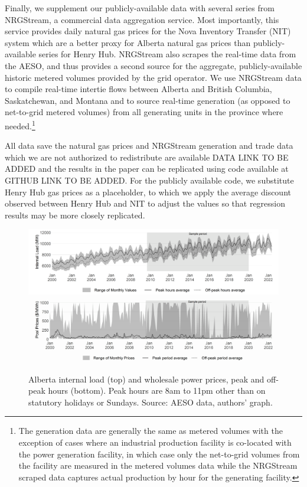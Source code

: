 \documentclass[12pt]{article}
\begin{document}
Finally, we supplement our publicly-available data with several series from NRGStream, a commercial data aggregation service. Most importantly, this service provides daily natural gas prices for the Nova Inventory Transfer (NIT) system which are a better proxy for Alberta natural gas prices than publicly-available series for Henry Hub. NRGStream also scrapes the real-time data from the AESO, and thus provides a second source for the aggregate, publicly-available historic metered volumes provided by the grid operator. We use NRGStream data to compile real-time intertie flows between Alberta and British Columbia, Saskatchewan, and Montana and to source real-time generation (as opposed to net-to-grid metered volumes) from all generating units in the province where needed.\footnote{The generation data are generally the same as metered volumes with the exception of cases where an industrial production facility is co-located with the power generation facility, in which case only the net-to-grid volumes from the facility are measured in the metered volumes data while the NRGStream scraped data captures actual production by hour for the generating facility.}

All data save the natural gas prices and NRGStream generation and trade data which we are not authorized to redistribute are available DATA LINK TO BE ADDED and the results in the paper can be replicated using code available at GITHUB LINK TO BE ADDED. For the publicly available code, we substitute Henry Hub gas prices as a placeholder, to which we apply the average discount observed between Henry Hub and NIT to adjust the values so that regression results may be more closely replicated.
\begin{figure}[h]%
	\centering \vspace{-.25cm} \includegraphics[width=6.5in]{../images/loads_clean.png}
	\centering \vspace{-.25cm} \includegraphics[width=6.5in]{../images/peak_prices.png}
\vspace{-0.75cm}	\caption{Alberta internal load (top) and wholesale power prices, peak and off-peak hours (bottom). Peak hours are 8am to 11pm other than on statutory holidays or Sundays. Source: AESO data, authors' graph.}
\label{fig:ab_prices_and_loads}
\end{figure}
\end{document}

